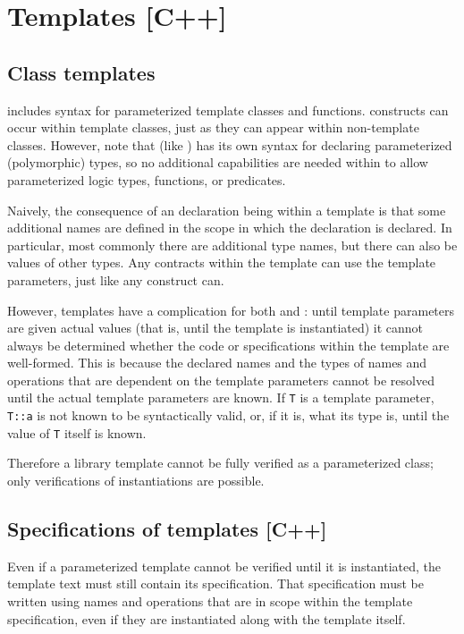 \section{Templates [C++]}
\label{sec:tempaltes}
\subsection{Class templates}

\lang includes syntax for parameterized template classes and functions.  \NAME constructs can occur within template classes, just as they can appear within non-template classes. However, note that \NAME (like \acsl) has its own syntax for declaring parameterized (polymorphic) types, so no additional 
capabilities are needed within \NAME to allow
parameterized logic types, functions, or predicates.

Naively, the consequence of an \NAME declaration being within a template is that some additional names are defined in the scope in which the \NAME declaration is declared. In particular, most commonly there are additional type names, but there can also be values of other types. Any \NAME contracts within the template can use the template parameters, just like any \lang construct can. 

However, templates have a complication for both \lang and \NAME: until template parameters are given actual values (that is, until the template is instantiated) it cannot always be determined whether the code or specifications within the template are well-formed. This is because the declared names and the types of names and operations that are dependent on the template parameters cannot be resolved until the actual template parameters are known.  If \lstinline|T| is a template parameter, \lstinline|T::a| is not known to be syntactically valid, or, if it is, what its type is, until the value of \lstinline|T| itself is known.

Therefore a library template cannot be fully verified as a parameterized class; only verifications of instantiations are possible.

\subsection{Specifications of templates [C++]}

Even if a parameterized template cannot be verified until it is instantiated, the template text must still contain its specification. That specification must be written using names and operations that are in scope within the template specification, even if they are instantiated along with the template itself.

